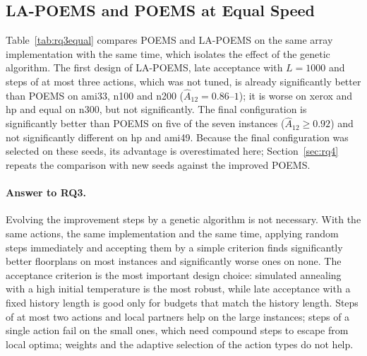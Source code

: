 \subsection{LA-POEMS and POEMS at Equal Speed}

Table~\ref{tab:rq3equal} compares POEMS and LA-POEMS on the same array implementation with the same time, which isolates the effect of the genetic algorithm. The first design of LA-POEMS, late acceptance with $L = 1000$ and steps of at most three actions, which was not tuned, is already significantly better than POEMS on ami33, n100 and n200 ($\hat{A}_{12} = 0.86$--$1$); it is worse on xerox and hp and equal on n300, but not significantly. The final configuration is significantly better than POEMS on five of the seven instances ($\hat{A}_{12} \geq 0.92$) and not significantly different on hp and ami49. Because the final configuration was selected on these seeds, its advantage is overestimated here; Section~\ref{sec:rq4} repeats the comparison with new seeds against the improved POEMS.



\paragraph{Answer to RQ3.} Evolving the improvement steps by a genetic algorithm is not necessary. With the same actions, the same implementation and the same time, applying random steps immediately and accepting them by a simple criterion finds significantly better floorplans on most instances and significantly worse ones on none. The acceptance criterion is the most important design choice: simulated annealing with a high initial temperature is the most robust, while late acceptance with a fixed history length is good only for budgets that match the history length. Steps of at most two actions and local partners help on the large instances; steps of a single action fail on the small ones, which need compound steps to escape from local optima; weights and the adaptive selection of the action types do not help.
